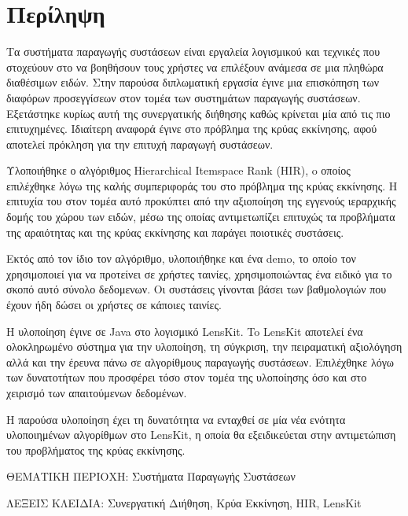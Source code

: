 \chapter*{Περίληψη}

Τα συστήματα παραγωγής συστάσεων είναι εργαλεία λογισμικού και τεχνικές που στοχεύουν στο να βοηθήσουν τους χρήστες να επιλέξουν ανάμεσα σε μια πληθώρα διαθέσιμων ειδών. Στην παρούσα διπλωματική εργασία έγινε μια επισκόπηση των διαφόρων προσεγγίσεων στον τομέα των συστημάτων παραγωγής συστάσεων. Εξετάστηκε κυρίως αυτή της συνεργατικής διήθησης καθώς κρίνεται μία από τις πιο επιτυχημένες. Ιδιαίτερη αναφορά έγινε στο πρόβλημα της κρύας εκκίνησης, αφού αποτελεί πρόκληση για την επιτυχή παραγωγή συστάσεων. \par
Υλοποιήθηκε ο αλγόριθμος {\en Hierarchical Itemspace Rank (HIR)}, o οποίος επιλέχθηκε λόγω της καλής συμπεριφοράς του στο πρόβλημα της κρύας εκκίνησης. Η επιτυχία του στον τομέα αυτό προκύπτει από την αξιοποίηση της εγγενούς ιεραρχικής δομής του χώρου των ειδών, μέσω της οποίας αντιμετωπίζει επιτυχώς τα προβλήματα της αραιότητας και της κρύας εκκίνησης και παράγει ποιοτικές συστάσεις.\par
Εκτός από τον ίδιο τον αλγόριθμο, υλοποιήθηκε και ένα {\en demo}, το οποίο τον χρησιμοποιεί για να προτείνει σε χρήστες ταινίες, χρησιμοποιώντας ένα ειδικό για το σκοπό αυτό σύνολο δεδομενων. Οι συστάσεις γίνονται βάσει των βαθμολογιών που έχουν ήδη δώσει οι χρήστες σε κάποιες ταινίες. \par
Η υλοποίηση έγινε σε {\en Java} στο λογισμικό {\en LensKit}. To {\en LensKit} αποτελεί ένα ολοκληρωμένο σύστημα για την υλοποίηση, τη σύγκριση, την πειραματική αξιολόγηση αλλά και την έρευνα πάνω σε αλγορίθμους παραγωγής συστάσεων. Επιλέχθηκε λόγω των δυνατοτήτων που προσφέρει τόσο στον τομέα της υλοποίησης όσο και στο χειρισμό των απαιτούμενων δεδομένων.\par
Η παρούσα υλοποίηση έχει τη δυνατότητα να ενταχθεί σε μία νέα ενότητα υλοποιημένων αλγορίθμων στο {\en LensKit}, η οποία θα εξειδικεύεται στην αντιμετώπιση του προβλήματος της κρύας εκκίνησης. \\ 

\par ΘΕΜΑΤΙΚΗ ΠΕΡΙΟΧΗ: Συστήματα Παραγωγής Συστάσεων
\par ΛΕΞΕΙΣ ΚΛΕΙΔΙΑ: Συνεργατική Διήθηση, Κρύα Εκκίνηση, {\en HIR, LensKit} 

